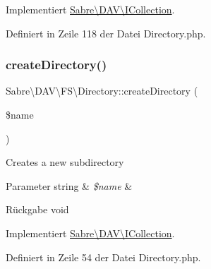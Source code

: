 Implementiert \mbox{\hyperlink{interface_sabre_1_1_d_a_v_1_1_i_collection_a81b44dc1354370890279af58c34c7375}{Sabre\textbackslash{}\+D\+A\+V\textbackslash{}\+I\+Collection}}.



Definiert in Zeile 118 der Datei Directory.\+php.

\mbox{\label{class_sabre_1_1_d_a_v_1_1_f_s_1_1_directory_ad12fb8ed1ed2c09ecf644068f349a0c8}} 
\subsubsection{\texorpdfstring{create\+Directory()}{createDirectory()}}
{\footnotesize\ttfamily Sabre\textbackslash{}\+D\+A\+V\textbackslash{}\+F\+S\textbackslash{}\+Directory\+::create\+Directory (\begin{DoxyParamCaption}\item[{}]{\$name }\end{DoxyParamCaption})}

Creates a new subdirectory


\begin{DoxyParams}[1]{Parameter}
string & {\em \$name} & \\
\hline
\end{DoxyParams}
\begin{DoxyReturn}{Rückgabe}
void 
\end{DoxyReturn}


Implementiert \mbox{\hyperlink{interface_sabre_1_1_d_a_v_1_1_i_collection_a11e8eb888fffe1d792acebbe5bc59243}{Sabre\textbackslash{}\+D\+A\+V\textbackslash{}\+I\+Collection}}.



Definiert in Zeile 54 der Datei Directory.\+php.

\mbox{\label{class_sabre_1_1_d_a_v_1_1_f_s_1_1_directory_a5f0b8f6641480deb70c711d32e33d59b}} 
